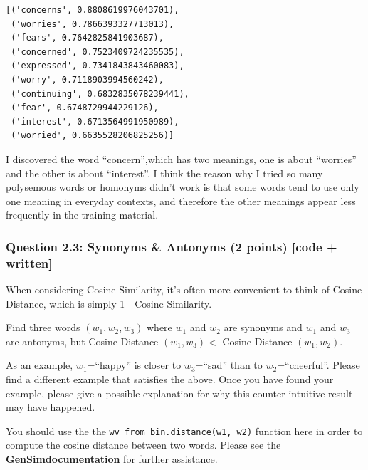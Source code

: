 \documentclass[11pt]{article}
\makeatletter
\newcommand{\boxspacing}{\kern\kvtcb@left@rule\kern\kvtcb@boxsep}
\newcommand{\prompt}[4]{
        {\ttfamily\llap{{\color{#2}[#3]:\hspace{3pt}#4}}\vspace{-\baselineskip}}
    }
\makeatother
\begin{document}
            \begin{tcolorbox}[breakable, size=fbox, boxrule=.5pt, pad at break*=1mm, opacityfill=0]
\prompt{Out}{outcolor}{80}{\boxspacing}
\begin{Verbatim}[commandchars=\\\{\}]
[('concerns', 0.8808619976043701),
 ('worries', 0.7866393327713013),
 ('fears', 0.7642825841903687),
 ('concerned', 0.7523409724235535),
 ('expressed', 0.7341843843460083),
 ('worry', 0.7118903994560242),
 ('continuing', 0.6832835078239441),
 ('fear', 0.6748729944229126),
 ('interest', 0.6713564991950989),
 ('worried', 0.6635528206825256)]
\end{Verbatim}
\end{tcolorbox}
        
    I discovered the word ``concern'',which has two meanings, one is about
``worries'' and the other is about ``interest''. I think the reason why
I tried so many polysemous words or homonyms didn't work is that some
words tend to use only one meaning in everyday contexts, and therefore
the other meanings appear less frequently in the training material.

    \subsubsection{Question 2.3: Synonyms \& Antonyms (2 points) {[}code +
written{]}}\label{question-2.3-synonyms-antonyms-2-points-code-written}

When considering Cosine Similarity, it's often more convenient to think
of Cosine Distance, which is simply 1 - Cosine Similarity.

Find three words \((w_1,w_2,w_3)\) where \(w_1\) and \(w_2\) are
synonyms and \(w_1\) and \(w_3\) are antonyms, but Cosine Distance
\((w_1,w_3) <\) Cosine Distance \((w_1,w_2)\).

As an example, \(w_1\)=``happy'' is closer to \(w_3\)=``sad'' than to
\(w_2\)=``cheerful''. Please find a different example that satisfies the
above. Once you have found your example, please give a possible
explanation for why this counter-intuitive result may have happened.

You should use the the \texttt{wv\_from\_bin.distance(w1,\ w2)} function
here in order to compute the cosine distance between two words. Please
see the \textbf{\href{https://radimrehurek.com/gensim/models/keyedvectors.html\#gensim.models.keyedvectors.FastTextKeyedVectors.distance}{GenSimdocumentation}} for further assistance.
\end{document}
